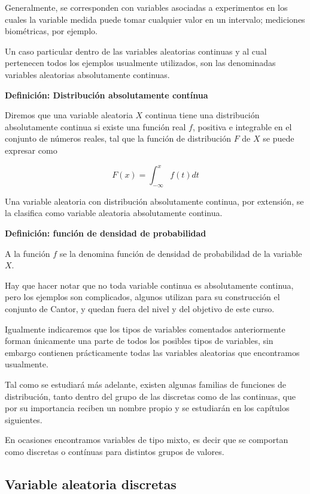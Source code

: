\documentclass[
]{article}
\begin{document}
Generalmente, se corresponden con variables asociadas a experimentos en
los cuales la variable medida puede tomar cualquier valor en un
intervalo; mediciones biométricas, por ejemplo.

Un caso particular dentro de las variables aleatorias continuas y al
cual pertenecen todos los ejemplos usualmente utilizados, son las
denominadas variables aleatorias absolutamente continuas.

\textbf{Definición: Distribución absolutamente contínua}

Diremos que una variable aleatoria \(X\) continua tiene una distribución
absolutamente continua si existe una función real \(f\), positiva e integrable en el conjunto de números reales, tal que la función de
distribución \(F\) de \(X\) se puede expresar como

\[
F(x)=\int_{-\infty}^{x} f(t) d t
\]

Una variable aleatoria con distribución absolutamente continua, por
extensión, se la clasifica como variable aleatoria absolutamente
continua.

\textbf{Definición: función de densidad de probabilidad}

A la función \(f\) se la denomina función de densidad de probabilidad de
la variable \(X\).

Hay que hacer notar que no toda variable continua es absolutamente
continua, pero los ejemplos son complicados, algunos utilizan para su
construcción el conjunto de Cantor, y quedan fuera del nivel y del
objetivo de este curso.

Igualmente indicaremos que los tipos de variables comentados
anteriormente forman únicamente una parte de todos los posibles tipos de
variables, sin embargo contienen prácticamente todas las variables
aleatorias que encontramos usualmente.

Tal como se estudiará más adelante, existen algunas familias de
funciones de distribución, tanto dentro del grupo de las discretas como
de las continuas, que por su importancia reciben un nombre propio y se
estudiarán en los capítulos siguientes.

En ocasiones encontramos variables de tipo mixto, es decir que se
comportan como discretas o contínuas para distintos grupos de valores.

\subsection{Variable aleatoria discretas}\label{variable-aleatoria-discretas}
\end{document}
